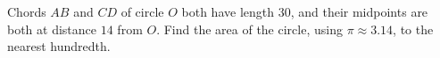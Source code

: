 Chords $AB$ and $CD$ of circle $O$ both have length $30$, and their midpoints are both at distance $14$ from $O$. Find the area of the circle, using $\pi\approx3.14$, to the nearest hundredth.
